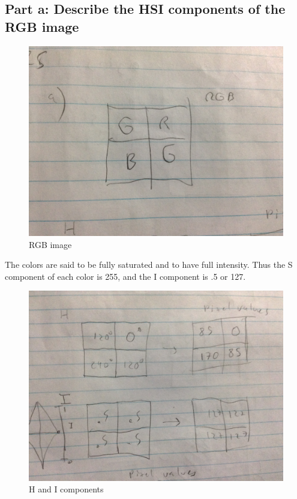 \documentclass{article}
\begin{document}
	\subsection{Part a: Describe the HSI components of the RGB image}
	\begin{figure}[H]
		\includegraphics[width=\linewidth]{6.25/fig1.JPG}
		\caption{RGB image}
	\end{figure}
	The colors are said to be fully saturated and to have full intensity.
	Thus the S component of each color is 255, and the I component is .5 or 127.
	\begin{figure}[H]
		\includegraphics[width=\linewidth]{6.25/fig2.JPG}
		\caption{H and I components}
	\end{figure}
\end{document}
